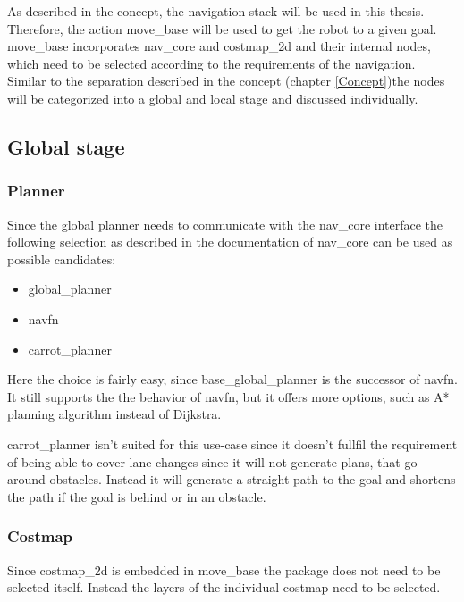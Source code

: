 As described in the concept, the navigation stack will be used in this thesis. Therefore, the action move\_base will be used to get the robot to a given goal.\\
 move\_base incorporates nav\_core and costmap\_2d and their internal nodes, which need to be selected according to the requirements of the navigation.\\
Similar to the separation described in the concept (chapter \ref{Concept})the nodes will be categorized into a global and local stage and discussed individually.

\subsection{Global stage}
\label{globalconfig}
\subsubsection{Planner}

Since the global planner needs to communicate with the nav\_core interface  the following selection as described in the documentation of nav\_core can be used as possible candidates\cite{navcore}:

\begin{itemize}
	\item global\_planner
	\item navfn
	\item carrot\_planner
\end{itemize}


Here the choice is fairly easy, since base\_global\_planner is the successor of navfn. It still supports the the behavior of navfn, but it offers more options, such as A* planning algorithm instead of Dijkstra.


carrot\_planner isn't suited for this use-case since it doesn't fullfil the requirement of being able to cover lane changes since it will not generate plans, that go around obstacles. Instead it will generate a straight path to the goal and shortens the path if the goal is behind or in an obstacle\cite{corrotplanner}.




\subsubsection{Costmap}
Since costmap\_2d is embedded in move\_base the package does not need to be selected itself. Instead the layers of the individual costmap need to be selected.\\

